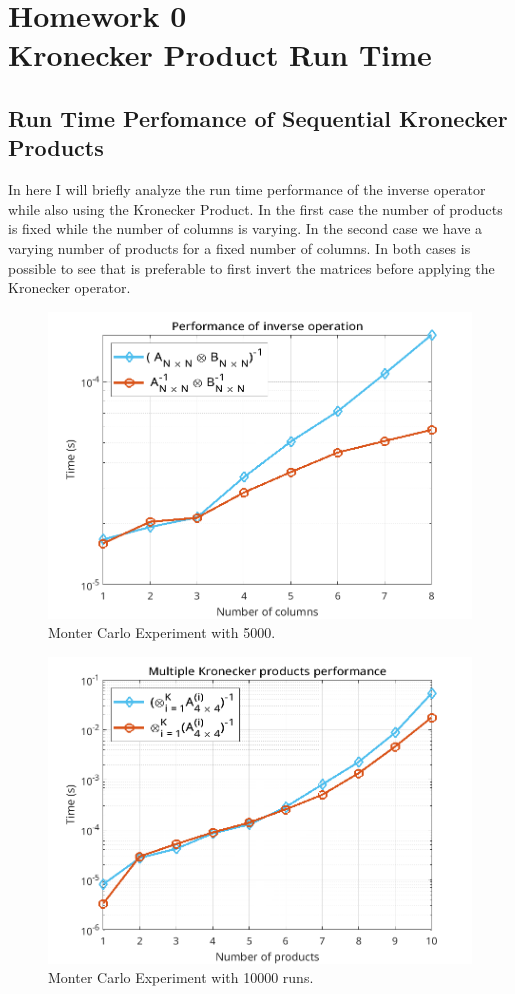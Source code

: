 \documentclass[a4paper,10pt]{article}
\begin{document}

\thispagestyle{empty}

\newpage

\thispagestyle{empty}

\newpage
\section*{Homework 0 \\ Kronecker Product Run Time}

    \subsection*{Run Time Perfomance of Sequential Kronecker Products}

    In here I will briefly analyze the run time performance of the inverse operator while also using the Kronecker Product. In the first case the number of products is fixed while the number of columns is varying. 
    In the second case we have a varying number of products for a fixed number of columns. In both cases is possible to see that is preferable to first invert the matrices before applying the Kronecker operator.  
    
    \begin{figure}[ht!]
        \centering 
        \includegraphics[width=0.65\linewidth]{figs/hw0a1.png} \par 
        \caption{Monter Carlo Experiment with 5000.}
        \label{fig:hw0a1} 
    \end{figure}

    \begin{figure}[ht!]
        \centering 
        \includegraphics[width=0.65\linewidth]{figs/hw0a2.png} \par 
        \caption{Monter Carlo Experiment with 10000 runs.}
        \label{fig:hw0a2} 
    \end{figure}
\end{document}
